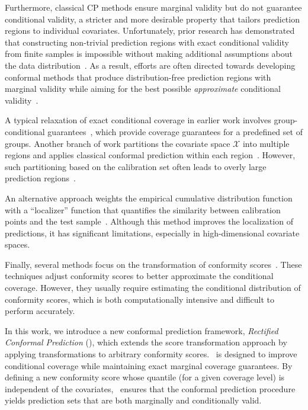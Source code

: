   Furthermore, classical CP methods ensure marginal validity but do not guarantee conditional validity, a stricter and more desirable property that tailors prediction regions to individual covariates. Unfortunately, prior research has demonstrated that constructing non-trivial prediction regions with exact conditional validity from finite samples is impossible without making additional assumptions about the data distribution~\citep{vovk2012conditional,lei2014distribution,foygel2021limits}. As a result, efforts are often directed towards developing conformal methods that produce distribution-free prediction regions with marginal validity while aiming for the best possible \textit{approximate} conditional validity~\cite{gibbs2024conditional}.

  A typical relaxation of exact conditional coverage in earlier work involves group-conditional guarantees~\cite{ding2024class, jung2022batch}, which provide coverage guarantees for a predefined set of groups. Another branch of work partitions the covariate space $\mathcal{X}$ into multiple regions and applies classical conformal prediction within each region~\cite{leroy2021md, alaa2023conformalized, kiyani2024conformal}. However, such partitioning based on the calibration set often leads to overly large prediction regions~\cite{bian2023training,plassier2024efficient}.

  An alternative approach weights the empirical cumulative distribution function with a ``localizer'' function that quantifies the similarity between calibration points and the test sample~\cite{guan2023localized}. Although this method improves the localization of predictions, it has significant limitations, especially in high-dimensional covariate spaces.

  Finally, several methods focus on the transformation of conformity scores~\cite{deutschmann2023adaptive,han2022split,dey2022conditionally,izbicki2022cd,dheur2024distribution}. These techniques adjust conformity scores to better approximate the conditional coverage. However, they usually require estimating the conditional distribution of conformity scores, which is both computationally intensive and difficult to perform accurately.

  In this work, we introduce a new conformal prediction framework, \textit{Rectified Conformal Prediction} (\RCP), which extends the score transformation approach by applying transformations to arbitrary conformity scores. \RCP\ is designed to improve conditional coverage while maintaining exact marginal coverage guarantees. By defining a new conformity score whose quantile (for a given coverage level) is independent of the covariates, \RCP\ ensures that the conformal prediction procedure yields prediction sets that are both marginally and conditionally valid. 


